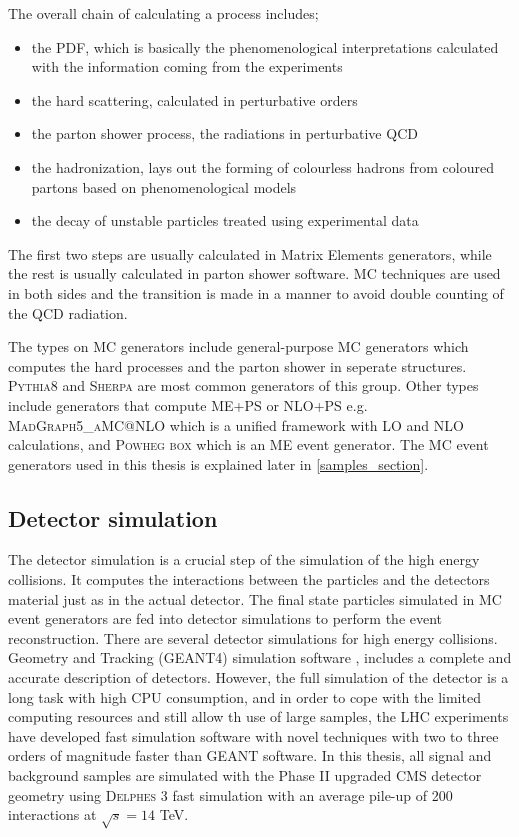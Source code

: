 The overall chain of calculating a process includes;
\begin{itemize}
    \item the PDF, which is basically the phenomenological interpretations calculated with the information coming from the experiments
    \item the hard scattering, calculated in perturbative orders
    \item the parton shower process, the radiations in perturbative QCD
    \item the hadronization, lays out the forming of colourless hadrons from coloured partons based on phenomenological models
    \item the decay of unstable particles treated using experimental data
\end{itemize}
The first two steps are usually calculated in Matrix Elements generators, while the rest is usually calculated in parton shower software. MC techniques are used in both sides and the transition is made in a manner to avoid double counting of the QCD radiation.

The types on MC generators include general-purpose MC generators which computes the hard processes and the parton shower in seperate structures. \textsc{Pythia8} and \textsc{Sherpa} are most common generators of this group. Other types include generators that compute ME+PS or NLO+PS e.g. \textsc{MadGraph5\_aMC@NLO} which is a unified framework with LO and NLO calculations, and \textsc{Powheg box} which is an ME event generator. The MC event generators used in this thesis is explained later in \autoref{samples_section}.

\subsection{Detector simulation}\label{detector_sim_subsection}

The detector simulation is a crucial step of the simulation of the high energy collisions. It computes the interactions between the particles and the detectors material just as in the actual detector. The final state particles simulated in MC event generators are fed into detector simulations to perform the event reconstruction. There are several detector simulations for high energy collisions. Geometry and Tracking (GEANT4) simulation software \cite{Agostinelli2003}, includes a complete and accurate description of detectors. However, the full simulation of the detector is a long task with high CPU consumption, and in order to cope with the limited computing resources and still allow th use of large samples, the LHC experiments have developed fast simulation software with novel techniques \cite{Sekmen:2242542, Lukas:2012kua} with two to three orders of magnitude faster than GEANT software. In this thesis, all signal and background samples are simulated with the Phase II upgraded CMS detector geometry using \textsc{Delphes} 3 fast simulation \cite{Selvaggi:2014mya} with an average pile-up of 200 interactions at $\sqrt{s}=14$ TeV.

